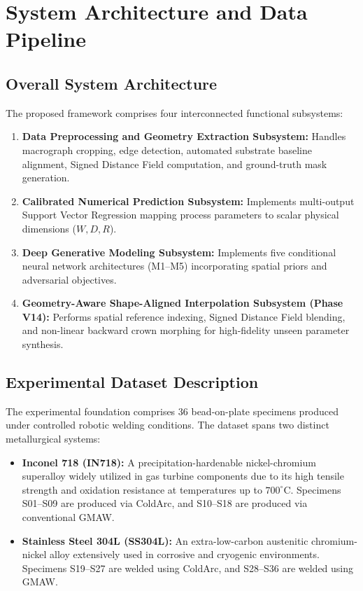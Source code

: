 \documentclass[12pt,a4paper,oneside]{report}
\begin{document}
\chapter{System Architecture and Data Pipeline}
\label{ch:methodology}

\section{Overall System Architecture}
The proposed framework comprises four interconnected functional subsystems:
\begin{enumerate}
    \item \textbf{Data Preprocessing and Geometry Extraction Subsystem:} Handles macrograph cropping, edge detection, automated substrate baseline alignment, Signed Distance Field computation, and ground-truth mask generation.
    \item \textbf{Calibrated Numerical Prediction Subsystem:} Implements multi-output Support Vector Regression mapping process parameters to scalar physical dimensions ($W, D, R$).
    \item \textbf{Deep Generative Modeling Subsystem:} Implements five conditional neural network architectures (M1--M5) incorporating spatial priors and adversarial objectives.
    \item \textbf{Geometry-Aware Shape-Aligned Interpolation Subsystem (Phase V14):} Performs spatial reference indexing, Signed Distance Field blending, and non-linear backward crown morphing for high-fidelity unseen parameter synthesis.
\end{enumerate}

\section{Experimental Dataset Description}
The experimental foundation comprises 36 bead-on-plate specimens produced under controlled robotic welding conditions. The dataset spans two distinct metallurgical systems:
\begin{itemize}
    \item \textbf{Inconel 718 (IN718):} A precipitation-hardenable nickel-chromium superalloy widely utilized in gas turbine components due to its high tensile strength and oxidation resistance at temperatures up to $700^\circ\text{C}$. Specimens S01--S09 are produced via ColdArc, and S10--S18 are produced via conventional GMAW.
    \item \textbf{Stainless Steel 304L (SS304L):} An extra-low-carbon austenitic chromium-nickel alloy extensively used in corrosive and cryogenic environments. Specimens S19--S27 are welded using ColdArc, and S28--S36 are welded using GMAW.
\end{itemize}
\end{document}
